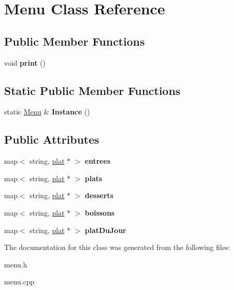 \hypertarget{class_menu}{}\section{Menu Class Reference}
\label{class_menu}
\subsection*{Public Member Functions}
\begin{DoxyCompactItemize}
\item 
void {\bfseries print} ()\hypertarget{class_menu_aa6ff784314cc009478562d9ab7a0af34}{}\label{class_menu_aa6ff784314cc009478562d9ab7a0af34}

\end{DoxyCompactItemize}
\subsection*{Static Public Member Functions}
\begin{DoxyCompactItemize}
\item 
static \hyperlink{class_menu}{Menu} \& {\bfseries Instance} ()\hypertarget{class_menu_abf4f7a7a301a4819073f5ecbd2a4aba7}{}\label{class_menu_abf4f7a7a301a4819073f5ecbd2a4aba7}

\end{DoxyCompactItemize}
\subsection*{Public Attributes}
\begin{DoxyCompactItemize}
\item 
map$<$ string, \hyperlink{classplat}{plat} $\ast$ $>$ {\bfseries entrees}\hypertarget{class_menu_a9e408069ef709e0ce388173d1f07f45c}{}\label{class_menu_a9e408069ef709e0ce388173d1f07f45c}

\item 
map$<$ string, \hyperlink{classplat}{plat} $\ast$ $>$ {\bfseries plats}\hypertarget{class_menu_a1d569537acb4f4098afd35f9b44504ec}{}\label{class_menu_a1d569537acb4f4098afd35f9b44504ec}

\item 
map$<$ string, \hyperlink{classplat}{plat} $\ast$ $>$ {\bfseries desserts}\hypertarget{class_menu_ad9e2231c389e30662a8b8d7ef34f73da}{}\label{class_menu_ad9e2231c389e30662a8b8d7ef34f73da}

\item 
map$<$ string, \hyperlink{classplat}{plat} $\ast$ $>$ {\bfseries boissons}\hypertarget{class_menu_a417c680f4f80d044d74f76643baedd36}{}\label{class_menu_a417c680f4f80d044d74f76643baedd36}

\item 
map$<$ string, \hyperlink{classplat}{plat} $\ast$ $>$ {\bfseries plat\+Du\+Jour}\hypertarget{class_menu_a2154df619406f8aef136f79c17b2b43d}{}\label{class_menu_a2154df619406f8aef136f79c17b2b43d}

\end{DoxyCompactItemize}


The documentation for this class was generated from the following files\+:\begin{DoxyCompactItemize}
\item 
menu.\+h\item 
menu.\+cpp\end{DoxyCompactItemize}

